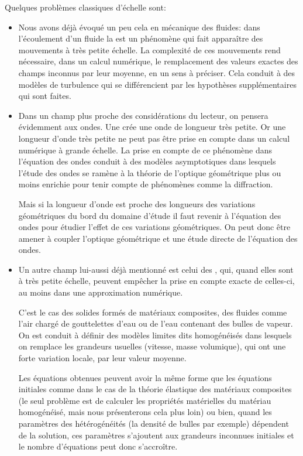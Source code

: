 Quelques problèmes classiques d'échelle sont:
\begin{itemize}
  \item Nous avons déjà évoqué un peu cela en mécanique des fluides:
	dans l'écoulement d'un fluide la  est un phénomène qui fait apparaître des mouvements à très petite échelle. La complexité de ces mouvements rend nécessaire, dans un calcul numérique, le remplacement des valeurs exactes des champs inconnus par leur moyenne, en un sens à préciser. Cela conduit à des modèles de turbulence qui se différencient par les hypothèses supplémentaires qui sont faites.
  \item Dans un champ plus proche des considérations du lecteur, on pensera évidemment
	aux ondes.
	Une  crée une onde de longueur très petite. Or une longueur d'onde très petite ne peut pas être prise en compte dans un calcul numérique à grande échelle. La prise en compte de ce phénomène dans l'équation des ondes conduit à des modèles asymptotiques dans lesquels l'étude des ondes se ramène à la théorie de l'optique géométrique plus ou moins enrichie pour tenir compte de phénomènes comme la diffraction.

	Mais si la longueur d'onde est proche des longueurs des variations géométriques du bord du domaine d'étude il faut revenir à l'équation des ondes pour étudier l'effet de ces variations géométriques. On peut donc être amener à coupler l'optique géométrique et une étude directe de l'équation des ondes.
  \item Un autre champ lui-aussi déjà mentionné est celui des , qui, quand elles sont à très petite échelle, peuvent empêcher la prise en compte exacte de celles-ci, au moins dans une approximation numérique.

	C'est le cas des solides formés de matériaux composites, des fluides comme l'air 	chargé de gouttelettes d'eau ou de l'eau contenant des bulles de vapeur. On est conduit à définir des modèles limites dits homogénéisés dans lesquels on remplace les grandeurs usuelles (vitesse, masse volumique), qui ont une forte variation locale, par leur valeur moyenne.

	Les équations obtenues peuvent avoir la même forme que les équations initiales comme dans le cas de la théorie élastique des matériaux composites (le seul problème est de calculer les propriétés matérielles du matériau homogénéisé, mais nous présenterons cela plus loin) ou bien, quand les paramètres des hétérogénéités (la densité de bulles par exemple) dépendent de la solution, ces paramètres s'ajoutent aux grandeurs inconnues initiales et le nombre d'équations peut donc s'accroître.
\end{itemize}


